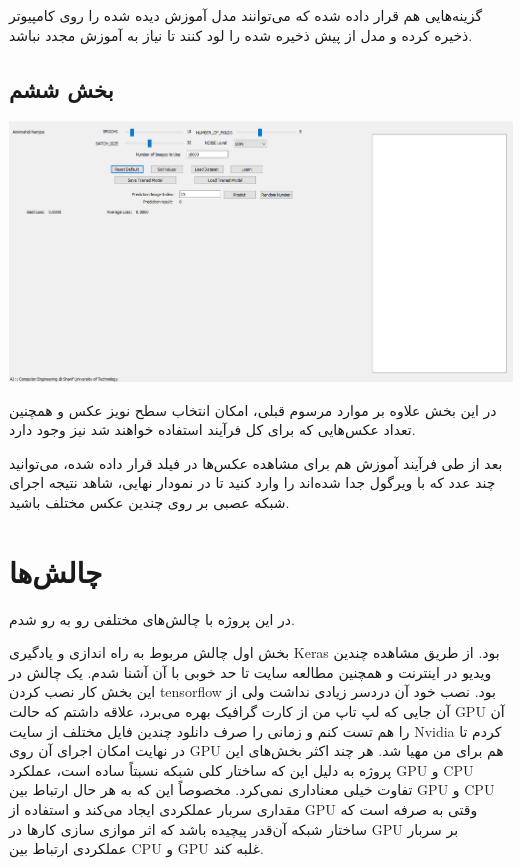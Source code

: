 \documentclass[12pt,titlepage,a4page , tikz , multi,table , svgnames,xcdraw]{article}
\begin{document}
گزینه‌هایی هم قرار داده شده که می‌توانند مدل آموزش دیده شده را روی کامپیوتر ذخیره کرده و مدل از پیش ذخیره شده را لود کنند تا نیاز به آموزش مجدد نباشد.


 

\newpage


\subsection{بخش ششم}

\begin{center}

 \includegraphics[width=1.1\textwidth]{pictures/29.png}

\end{center}

در این بخش علاوه بر موارد مرسوم قبلی، امکان انتخاب سطح نویز عکس و همچنین تعداد عکس‌هایی که برای کل فرآیند استفاده خواهند شد نیز وجود دارد.

بعد از طی فرآیند آموزش هم برای مشاهده عکس‌ها در فیلد قرار داده شده، می‌توانید چند عدد که با ویرگول جدا شده‌اند را وارد کنید تا در نمودار نهایی، شاهد نتیجه اجرای شبکه عصبی بر روی چندین عکس مختلف باشید.






\newpage



\section{چالش‌ها}

در این پروژه با چالش‌های مختلفی رو به رو شدم.

بخش اول چالش مربوط به راه اندازی و یادگیری Keras بود. از طریق مشاهده چندین ویدیو در اینترنت و همچنین مطالعه سایت  تا حد خوبی با آن آشنا شدم. یک چالش در این بخش کار نصب کردن tensorflow بود. نصب خود آن دردسر زیادی نداشت ولی از آن جایی که لپ تاپ من از کارت گرافیک  بهره می‌برد، علاقه داشتم که حالت GPU آن را هم تست کنم و زمانی را صرف دانلود چندین فایل مختلف از سایت Nvidia کردم تا در نهایت امکان اجرای آن روی GPU هم برای من مهیا شد. هر چند اکثر بخش‌های این پروژه به دلیل این که ساختار کلی شبکه نسبتاً ساده است، عملکرد GPU و CPU تفاوت خیلی معناداری نمی‌کرد. مخصوصاً این که به هر حال ارتباط بین GPU و CPU مقداری سربار عملکردی ایجاد می‌کند و استفاده از GPU وقتی به صرفه است که ساختار شبکه آن‌قدر پیچیده باشد که اثر موازی سازی کارها در GPU بر سربار عملکردی ارتباط بین CPU و GPU غلبه کند.
\end{document}

